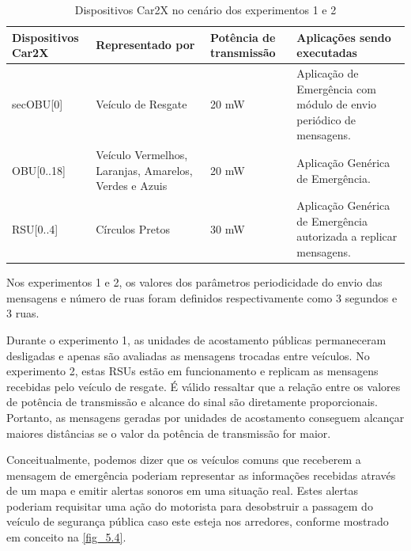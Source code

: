 \documentclass[
12pt,				%
openright,			%
oneside,			%
a4paper,			%
brazil,				%
]{abntex2}
\begin{document}
	 \begin{table}[H]
	 	\centering
	 	\renewcommand{\arraystretch}{1.5}
	 	\begin{tabular}{|p{2.4cm}|p{3.65cm}|p{2.5cm}|p{6cm}|}
	 		\hline
	 		\textbf{Dispositivos Car2X} & \textbf{Representado por} & \textbf{Potência de transmissão} & \textbf{Aplicações sendo executadas} \\ \hline
	 		secOBU{[}0{]} & Veículo de Resgate & 20 mW & Aplicação de Emergência com módulo de envio periódico de mensagens. \\ \hline
	 		OBU{[}0..18{]} & Veículo Vermelhos, Laranjas, Amarelos, Verdes e Azuis & 20 mW & Aplicação Genérica de Emergência. \\ \hline
	 		RSU{[}0..4{]} & Círculos Pretos & 30 mW & Aplicação Genérica de Emergência autorizada a replicar mensagens. \\ \hline
	 	\end{tabular}
 		\caption{Dispositivos Car2X no cenário dos experimentos 1 e 2}
 		\label{tab_5.3}
	 \end{table}
	 
	\par Nos experimentos 1 e 2, os valores dos parâmetros periodicidade do envio das mensagens e número de ruas foram definidos respectivamente como 3 segundos e 3 ruas.
	
	\par Durante o experimento 1, as unidades de acostamento públicas permaneceram desligadas e apenas são avaliadas as mensagens trocadas entre veículos. No experimento 2, estas RSUs estão em funcionamento e replicam as mensagens recebidas pelo veículo de resgate. É válido ressaltar que a relação entre os valores de potência de transmissão e alcance do sinal são diretamente proporcionais. Portanto, as mensagens geradas por unidades de acostamento conseguem alcançar maiores distâncias se o valor da potência de transmissão for maior.
	
	\par Conceitualmente, podemos dizer que os veículos comuns que receberem a mensagem de emergência poderiam representar as informações recebidas através de um mapa e emitir alertas sonoros em uma situação real. Estes alertas poderiam requisitar uma ação do motorista para desobstruir a passagem do veículo de segurança pública caso este esteja nos arredores, conforme mostrado em conceito na \autoref{fig_5.4}.
	
\end{document}
